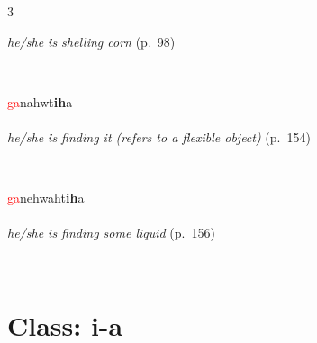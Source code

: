 \documentclass[oneside,openany]{book}%
\begin{document}
\begin{multicols}{3}
\begin{minipage}[t]{\linewidth}
\noindent \textit{he/she is shelling corn} (p.~98)
\end{minipage}\\[1em]%
\begin{minipage}[t]{\linewidth}
\raggedright\noindent \textcolor{Red}{ga}nahwt\textbf{ih}a\\
\\
\noindent \textit{he/she is finding it (refers to a flexible object)} (p.~154)
\end{minipage}\\[1em]%
\begin{minipage}[t]{\linewidth}
\raggedright\noindent \textcolor{Red}{ga}nehwaht\textbf{ih}a\\
\\
\noindent \textit{he/she is finding some liquid} (p.~156)
\end{minipage}\\[1em]%
\end{multicols}%
\vspace{1em}%
\needspace{3in}%
\section*{Class: i-a}%
%
\needspace{1.5in}%
\end{document}
